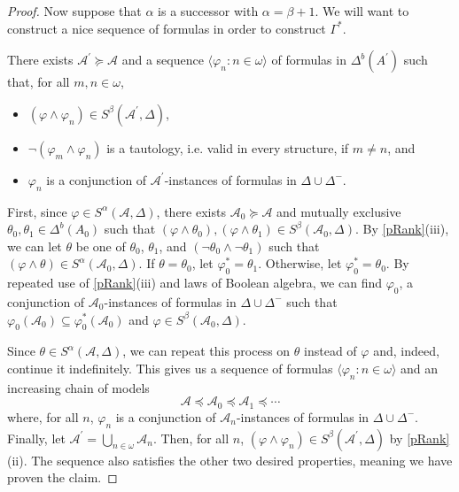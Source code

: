 \documentclass{article}
\let\mc\mathcal
\begin{document}
\begin{proof}
    Now suppose that $\alpha$ is a successor with $\alpha = \beta + 1$. We will want to construct a nice sequence of formulas in order to construct $\Gamma^{\ast}$.
    \begin{claim}
    There exists $\mc{A}^{\prime} \succeq \mc{A}$ and a sequence $\langle \varphi_n : n \in \omega \rangle$ of formulas in $\Delta^b(A^{\prime})$ such that, for all $m, n \in \omega$,
    \begin{itemize}
        \item $(\varphi \land \varphi_n) \in S^{\beta}(\mc{A}^{\prime}, \Delta)$,
        \item $\neg(\varphi_m \land \varphi_n)$ is a tautology, i.e. valid in every structure, if $m \neq n$, and 
        \item $\varphi_n$ is a conjunction of $\mc{A}^{\prime}$-instances of formulas in $\Delta \cup \Delta^{-}$.
    \end{itemize}
    \end{claim}
    First, since $\varphi \in S^{\alpha}(\mc{A}, \Delta)$, there exists $\mc{A}_0 \succeq \mc{A}$ and mutually exclusive $\theta_0, \theta_1 \in \Delta^b(A_0)$ such that $(\varphi \land \theta_0), (\varphi \land \theta_1) \in S^{\beta}(\mc{A}_0, \Delta)$. By \autoref{pRank}(iii), we can let $\theta$ be one of $\theta_0$, $\theta_1$, and $(\neg\theta_0 \land \neg\theta_1)$ such that $(\varphi \land \theta) \in S^{\alpha}(\mc{A}_0, \Delta)$. If $\theta = \theta_0$, let $\varphi_0^{\ast} = \theta_1$. Otherwise, let $\varphi_0^{\ast} = \theta_0$. By repeated use of \autoref{pRank}(iii) and laws of Boolean algebra, we can find $\varphi_0$, a conjunction of $\mc{A}_0$-instances of formulas in $\Delta \cup \Delta^{-}$ such that $\varphi_0(\mc{A}_0) \subseteq \varphi_0^{\ast}(\mc{A}_0)$ and $\varphi \in S^{\beta}(\mc{A}_0, \Delta)$.

    Since $\theta \in S^{\alpha}(\mc{A}, \Delta)$, we can repeat this process on $\theta$ instead of $\varphi$ and, indeed, continue it indefinitely. This gives us a sequence of formulas $\langle \varphi_n : n \in \omega \rangle$ and an increasing chain of models
    \[ \mc{A} \preceq \mc{A}_0 \preceq \mc{A}_1 \preceq \cdots \]
    where, for all $n$, $\varphi_n$ is a conjunction of $\mc{A}_n$-instances of formulas in $\Delta \cup \Delta^{-}$. Finally, let $\mc{A}^{\prime} = \bigcup_{n \in \omega} \mc{A}_n$. Then, for all $n$, $(\varphi \land \varphi_n) \in S^{\beta}(\mc{A}^{\prime}, \Delta)$ by \autoref{pRank}(ii). The sequence also satisfies the other two desired properties, meaning we have proven the claim.


\end{proof}
\end{document}
